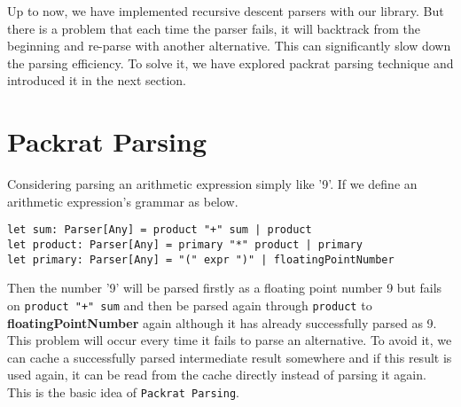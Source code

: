 Up to now, we have implemented recursive descent parsers with our library. But there is a problem that each time the parser fails, it will backtrack from the beginning and re-parse with another alternative. This can significantly slow down the parsing efficiency. To solve it, we have explored packrat parsing technique and introduced it in the next section.

\section{Packrat Parsing}
Considering parsing an arithmetic expression simply like '9'. If we define an arithmetic expression's grammar as below.
\begin{lstlisting}
let sum: Parser[Any] = product "+" sum | product
let product: Parser[Any] = primary "*" product | primary
let primary: Parser[Any] = "(" expr ")" | floatingPointNumber
\end{lstlisting}
Then the number '9' will be parsed firstly as a floating point number 9 but fails on \texttt{product "+" sum} and then be parsed again through \texttt{product} to \textbf{floatingPointNumber} again although it has already successfully parsed as 9. This problem will occur every time it fails to parse an alternative. To avoid it, we can cache a successfully parsed intermediate result somewhere and if this result is used again, it can be read from the cache directly instead of parsing it again. This is the basic idea of \texttt{Packrat Parsing}.

